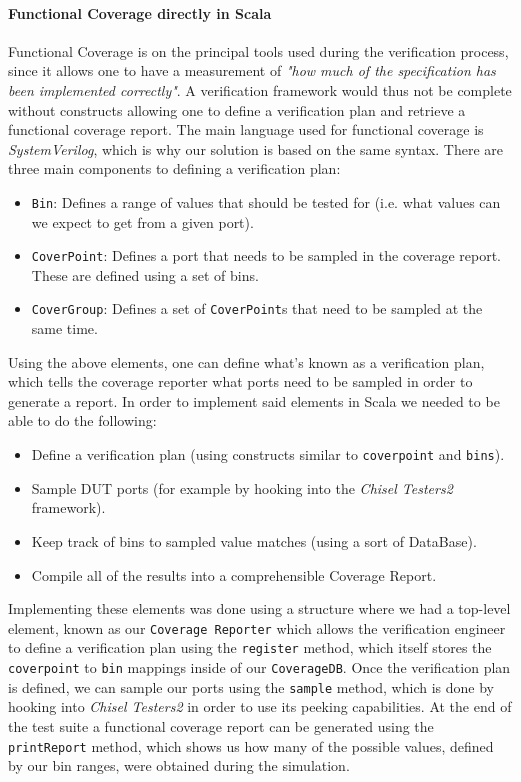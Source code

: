 \documentclass[conference]{IEEEtran}
\begin{document}
\paragraph{Functional Coverage directly in Scala}
Functional Coverage is on the principal tools used during the verification process, since it allows one to have a measurement of \textit{"how much of the specification has been implemented correctly"}. A verification framework would thus not be complete without constructs allowing one to define a verification plan and retrieve a functional coverage report. The main language used for functional coverage is \textit{SystemVerilog}, which is why our solution is based on the same syntax. There are three main components to defining a verification plan: 
\begin{itemize}
\item \texttt{Bin}: Defines a range of values that should be tested for (i.e. what values can we expect to get from a given port).
\item \texttt{CoverPoint}: Defines a port that needs to be sampled in the coverage report. These are defined using a set of bins.
\item \texttt{CoverGroup}: Defines a set of \texttt{CoverPoint}s that need to be sampled at the same time.
\end{itemize}
Using the above elements, one can define what's known as a verification plan, which tells the coverage reporter what ports need to be sampled in order to generate a report.
In order to implement said elements in Scala we needed to be able to do the following:
\begin{itemize}
\item Define a verification plan (using constructs similar to \texttt{coverpoint} and \texttt{bins}).
\item Sample DUT ports (for example by hooking into the \textit{Chisel Testers2} framework).
\item Keep track of bins to sampled value matches (using a sort of DataBase).
\item Compile all of the results into a comprehensible Coverage Report.
\end{itemize}
Implementing these elements was done using a structure where we had a top-level element, known as our \texttt{Coverage Reporter} which allows the verification engineer to define a verification plan using the \texttt{register} method, which itself stores the \texttt{coverpoint} to \texttt{bin} mappings inside of our \texttt{CoverageDB}. Once the verification plan is defined, we can sample our ports using the \texttt{sample} method, which is done by hooking into \textit{Chisel Testers2} in order to use its peeking capabilities. At the end of the test suite a functional coverage report can be generated using the \texttt{printReport} method, which shows us how many of the possible values, defined by our bin ranges, were obtained during the simulation.
\end{document}
